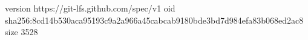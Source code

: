 version https://git-lfs.github.com/spec/v1
oid sha256:8cd14b530aca95193c9a2a966a45cabcab9180bde3bd7d984efa83b068ed2ac8
size 3528
